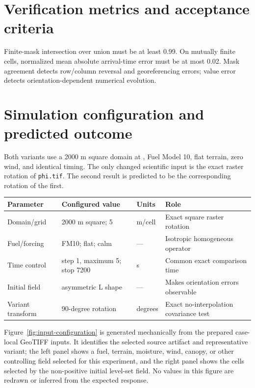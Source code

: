 \section{Verification metrics and acceptance criteria}

Finite-mask intersection over union must be at least 0.99. On mutually finite cells, normalized mean absolute arrival-time error must be at most 0.02. Mask agreement detects row/column reversal and georeferencing errors; value error detects orientation-dependent numerical evolution.

\section{Simulation configuration and predicted outcome}

Both variants use a 2000 m square domain at \CellSize{}, Fuel Model 10, flat terrain, zero wind, and identical timing. The only changed scientific input is the exact raster rotation of \texttt{phi.tif}. The second result is predicted to be the corresponding rotation of the first.

\begin{center}\begin{tabular}{p{}p{}p{}p{}}\toprule
Parameter & Configured value & Units & Role \\
\midrule Domain/grid & 2000 m square; 5 & m/cell & Exact square raster rotation \\
Fuel/forcing & FM10; flat; calm & --- & Isotropic homogeneous operator \\
Time control & step 1, maximum 5; stop 7200 & s & Common exact comparison time \\
Initial field & asymmetric L shape & --- & Makes orientation errors observable \\
Variant transform & 90-degree rotation & degrees & Exact no-interpolation covariance test \\
\bottomrule\end{tabular}\end{center}

Figure~\ref{fig:input-configuration} is generated mechanically from the prepared case-local GeoTIFF inputs. It identifies the selected source artifact and representative variant; the left panel shows a fuel, terrain, moisture, wind, canopy, or other controlling field selected for this experiment, and the right panel shows the cells selected by the non-positive initial level-set field. No values in this figure are redrawn or inferred from the expected response.

